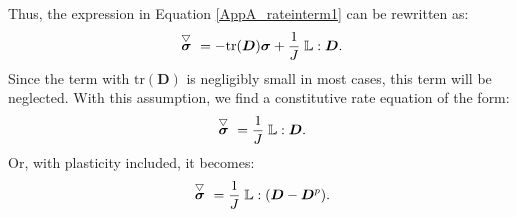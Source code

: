 \newline
Thus, the expression in Equation \ref{AppA_rateinterm1} can be rewritten as:
\begin{equation}
\acctriang{\boldsymbol{\sigma}} = -\text{tr}(\boldsymbol{D})\boldsymbol{\sigma} + \frac{1}{J}\; \boldsymbol{\mathbb L}:\boldsymbol{D}.
\end{equation}
Since the term with $\text{tr}(\boldsymbol{D})$ is negligibly small in most cases, this term will be neglected. With this assumption, we find a constitutive rate equation of the form:
\begin{equation}\label{AppA_consteq1}
\acctriang{\boldsymbol{\sigma}} = \frac{1}{J}\; \boldsymbol{\mathbb L}:\boldsymbol{D}.
\end{equation} 
Or, with plasticity included, it becomes:
\begin{equation}\label{AppA_consteq}
\acctriang{\boldsymbol{\sigma}} = \frac{1}{J}\; \boldsymbol{\mathbb L}:(\boldsymbol{D}-\boldsymbol{D}^p).
\end{equation} 

\newpage
